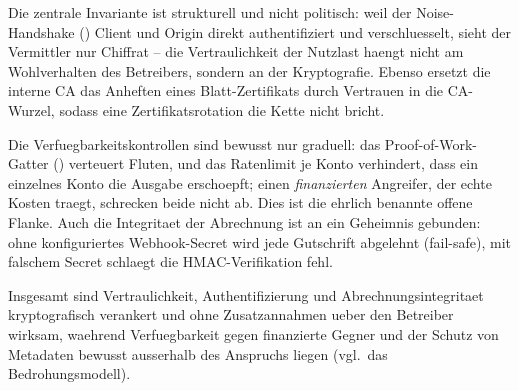 Die zentrale Invariante ist strukturell und nicht politisch: weil der
Noise-Handshake (\cite{perrin2018noise}) Client und Origin direkt
authentifiziert und verschluesselt, sieht der Vermittler nur Chiffrat -- die
Vertraulichkeit der Nutzlast haengt nicht am Wohlverhalten des Betreibers,
sondern an der Kryptografie. Ebenso ersetzt die interne CA das Anheften eines
Blatt-Zertifikats durch Vertrauen in die CA-Wurzel, sodass eine
Zertifikatsrotation die Kette nicht bricht.

Die Verfuegbarkeitskontrollen sind bewusst nur graduell: das
Proof-of-Work-Gatter (\cite{back2002hashcash}) verteuert Fluten, und das
Ratenlimit je Konto verhindert, dass ein einzelnes Konto die Ausgabe
erschoepft; einen \emph{finanzierten} Angreifer, der echte Kosten traegt,
schrecken beide nicht ab. Dies ist die ehrlich benannte offene Flanke. Auch die
Integritaet der Abrechnung ist an ein Geheimnis gebunden: ohne konfiguriertes
Webhook-Secret wird jede Gutschrift abgelehnt (fail-safe), mit falschem Secret
schlaegt die HMAC-Verifikation fehl.

Insgesamt sind Vertraulichkeit, Authentifizierung und Abrechnungsintegritaet
kryptografisch verankert und ohne Zusatzannahmen ueber den Betreiber wirksam,
waehrend Verfuegbarkeit gegen finanzierte Gegner und der Schutz von Metadaten
bewusst ausserhalb des Anspruchs liegen (vgl.\ das Bedrohungsmodell).
